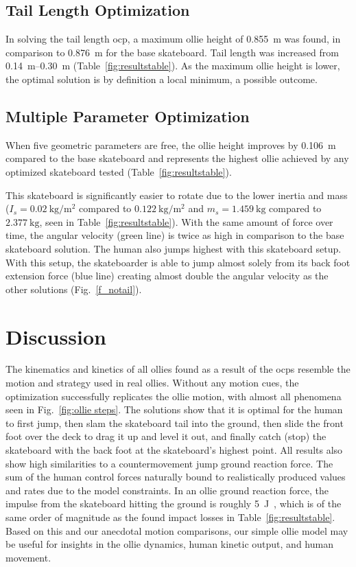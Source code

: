 \documentclass[default,iicol,pdflatex]{sn-jnl}
\begin{document}
\subsection{Tail Length Optimization}
In solving the tail length \gls{ocp}, a maximum ollie height of \SI{0.855}{\meter} was found, in comparison to \SI{0.876}{\meter} for the base skateboard. Tail length was increased from \SIrange{0.14}{0.30}{\meter} (Table~\ref{fig:resultstable}). As the maximum ollie height is lower, the optimal solution is by definition a local minimum, a possible outcome.

\subsection{Multiple Parameter Optimization}
When five geometric parameters are free, the ollie height improves by \SI{0.106}{\meter} compared to the base skateboard and represents the highest ollie achieved by any optimized skateboard tested (Table~\ref{fig:resultstable}). 

This skateboard is significantly easier to rotate due to the lower inertia and mass ($I_s = \SI{0.02}{\kilo\gram\per\meter\squared}$ compared to $\SI{0.122}{\kilo\gram\per\meter\squared}$ and $m_s = \SI{1.459}{\kilo\gram}$ compared to $\SI{2.377}{\kilo\gram}$, seen in Table~\ref{fig:resultstable}).
With the same amount of force over time, the angular velocity (green line) is twice as high in comparison to the base skateboard solution.
The human also jumps highest with this skateboard setup.
With this setup, the skateboarder is able to jump almost solely from its back foot extension force (blue line) creating almost double the angular velocity as the other solutions (Fig.~\ref{f_notail}).

\section{Discussion}
The kinematics and kinetics of all ollies found as a result of the \glspl{ocp} resemble the motion and strategy used in real ollies.
Without any motion cues, the optimization successfully replicates the ollie motion, with almost all phenomena seen in Fig.~\ref{fig:ollie steps}.
The solutions show that it is optimal for the human to first jump, then slam the skateboard tail into the ground, then slide the front foot over the deck to drag it up and level it out, and finally catch (stop) the skateboard with the back foot at the skateboard's highest point.
All results also show high similarities to a countermovement jump ground reaction force.
The sum of the human control forces naturally bound to realistically produced values and rates due to the model constraints.
In an ollie ground reaction force, the impulse from the skateboard hitting the ground is roughly \SI{5}{\joule}~\cite{determan_kinetics_2006}, which is of the same order of magnitude as the found impact losses in Table~\ref{fig:resultstable}.
Based on this and our anecdotal motion comparisons, our simple ollie model may be useful for insights in the ollie dynamics, human kinetic output, and human movement.
\end{document}
